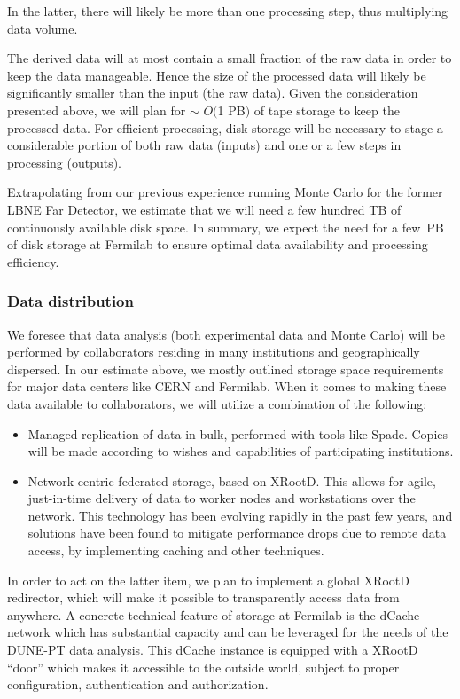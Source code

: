 In the latter, there will likely be more than one processing step, thus multiplying data volume. 

The derived data will at most contain a small fraction of the raw data in order to keep the data manageable.
Hence the size of the processed data will likely be significantly smaller than the input (the raw data). 
Given the consideration presented above, we will plan for
$\sim$ $O($1 PB$)$ of tape storage to keep the processed data. 
For efficient processing, disk storage will be necessary
to stage a considerable portion of both raw data (inputs) and one or a few steps in processing (outputs).

Extrapolating from our previous experience running Monte Carlo for the former LBNE Far Detector, we estimate that we will need a few hundred TB of continuously available
disk space. In summary, we expect the need for a few~PB of disk storage at Fermilab to ensure optimal data availability and 
processing efficiency. 

\subsubsection{Data distribution}
We foresee that data analysis (both experimental data and Monte Carlo) will be performed by collaborators residing in many 
institutions and geographically dispersed. In our
estimate above, we mostly outlined storage space requirements for major data centers like CERN and Fermilab. When it comes to making these data available to collaborators, we will utilize a combination of the following:
\begin{itemize}
\item Managed replication of data in bulk, performed with tools like Spade. Copies will be made according to wishes and capabilities of participating institutions.
\item Network-centric federated storage, based on XRootD. This allows for agile, just-in-time delivery of data to worker nodes and workstations over the network. This
technology has been evolving rapidly in the past few years, and solutions have been found to mitigate performance drops due to remote data access, by implementing caching and other techniques.
\end{itemize}

In order to act on the latter item, we plan to implement a global XRootD redirector, which will make it possible to transparently access data from anywhere.
A concrete technical feature of storage at Fermilab is the dCache network which has substantial capacity and can be leveraged
for the needs of the DUNE-PT data analysis. This dCache instance is equipped with a XRootD ``door'' which makes it accessible to the outside world, subject
to proper configuration, authentication and authorization.


